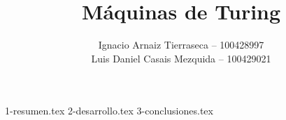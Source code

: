 \documentclass[es]{uc3mreport}
\author{
  Ignacio Arnaiz Tierraseca -- 100428997\\
  Luis Daniel Casais Mezquida -- 100429021
}
\title{Máquinas de Turing}
\begin{document}
  \makecover[old]

  \tableofcontents
  \listoffigures
  \listoftables

  \begin{report}
    {1-resumen.tex}
    {2-desarrollo.tex}
    {3-conclusiones.tex}
  \end{report}

  \makebibliography

\end{document}
